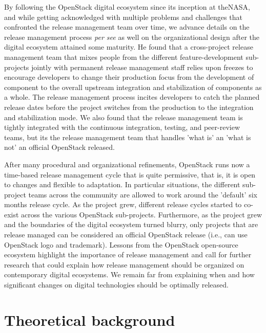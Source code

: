 \documentclass[dvipsnames]{interact}
\theoremstyle{plain}\newtheorem{theorem}{Theorem}[section]
\theoremstyle{definition}
\theoremstyle{remark}
\begin{document}
By following the OpenStack digital ecosystem since its inception at the\ac{NASA}, and while getting acknowledged with multiple problems and challenges that confronted the release management team over time, we advance details on the release management process \textit{per see} as well on the organizational design after the digital ecosystem attained some maturity. He found that a cross-project release management team that mixes people from the different feature-development sub-projects jointly with permanent release management staff relies upon freezes to encourage developers to change their production focus from the development of component to the overall upstream integration and stabilization of components as a whole. The release management process incites developers to catch the planned release dates before the project switches from the production to the integration and stabilization mode. We also found that the release management team is tightly integrated with the continuous integration, testing, and peer-review teams, but its the release management team that handles 'what is' an 'what is not' an official OpenStack released. 

After many procedural and organizational refinements, OpenStack runs now a time-based release management cycle that is quite permissive, that is, it is open to changes and flexible to adaptation. In particular situations, the different sub-project teams across the community are allowed to work around the 'default' six months release cycle. As the project grew, different release cycles started to co-exist across the various OpenStack sub-projects. Furthermore, as the project grew and the boundaries of the digital ecosystem turned blurry, only projects that are release managed can be considered an official OpenStack release (i.e., can use OpenStack logo and trademark). Lessons from the OpenStack open-source ecosystem highlight the importance of release management and call for further research that could explain how release management should be organized on contemporary digital ecosystems. We remain far from explaining when and how significant changes on digital technologies should be optimally released.  


\section{Theoretical background}

\end{document}
